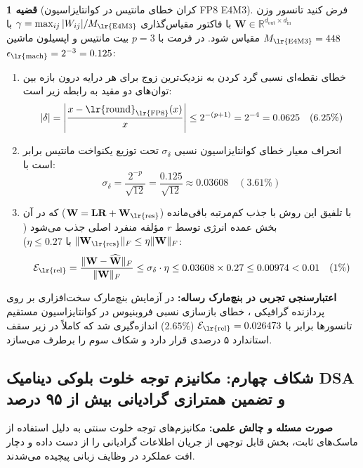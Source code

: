 \documentclass[12pt,a4paper]{report}
\theoremstyle{definition}
\newtheorem{theorem}{قضیه}[chapter]
\begin{document}
\begin{theorem}[کران خطای مانتیس در کوانتایزاسیون FP8 E4M3]
\label{thm:fp8_mantissa_bound}
فرض کنید تانسور وزن $\mathbf{W} \in \mathbb{R}^{d_{\text{out}} \times d_{\text{in}}}$ با فاکتور مقیاس‌گذاری $\gamma = \max_{ij} |W_{ij}| / M_{\text{\lr{E4M3}}}$ با $M_{\text{\lr{E4M3}}} = 448$ مقیاس شود. در فرمت  با $p = 3$ بیت مانتیس و اپسیلون ماشین $\epsilon_{\text{\lr{mach}}} = 2^{-3} = 0.125$:
\begin{enumerate}
    \item خطای نقطه‌ای نسبی گرد کردن به نزدیک‌ترین زوج  برای هر درایه درون بازه بین توان‌های دو مقید به رابطه زیر است:
    \begin{equation}
    |\delta| = \left| \frac{x - \text{\lr{round}}_{\text{\lr{FP8}}}(x)}{x} \right| \le 2^{-(p+1)} = 2^{-4} = 0.0625 \quad (6.25\%)
    \end{equation}
    \item انحراف معیار خطای کوانتایزاسیون نسبی $\sigma_\delta$ تحت توزیع یکنواخت مانتیس برابر است با:
    \begin{equation}
    \sigma_\delta = \frac{2^{-p}}{\sqrt{12}} = \frac{0.125}{\sqrt{12}} \approx 0.03608 \quad (3.61\%)
    \end{equation}
    \item با تلفیق این روش با جذب کم‌مرتبه باقی‌مانده ($\mathbf{W} = \mathbf{L}\mathbf{R} + \mathbf{W}_{\text{\lr{res}}}$) که در آن بخش عمده انرژی توسط $r$ مؤلفه منفرد اصلی جذب می‌شود ($\|\mathbf{W}_{\text{\lr{res}}}\|_F \le \eta \|\mathbf{W}\|_F$ با $\eta \le 0.27$):
    \begin{equation}
    \mathcal{E}_{\text{\lr{rel}}} = \frac{\|\mathbf{W} - \widehat{\mathbf{W}}\|_F}{\|\mathbf{W}\|_F} \le \sigma_\delta \cdot \eta \le 0.03608 \times 0.27 \le 0.00974 < 0.01 \quad (1\%)
    \end{equation}
\end{enumerate}
\end{theorem}

\textbf{اعتبارسنجی تجربی در بنچ‌مارک رساله:} در آزمایش بنچ‌مارک سخت‌افزاری بر روی پردازنده گرافیکی ، خطای بازسازی نسبی فروبنیوس در کوانتایزاسیون مستقیم تانسورها برابر با $\mathcal{E}_{\text{\lr{rel}}} = 0.026473$ ($2.65\%$) اندازه‌گیری شد که کاملاً در زیر سقف استاندارد ۵ درصدی قرار دارد و شکاف سوم را برطرف می‌سازد.

\subsection{شکاف چهارم: مکانیزم توجه خلوت بلوکی دینامیک DSA و تضمین همترازی گرادیانی بیش از ۹۵ درصد}
\label{subsec:gap4_dsa_gradient_alignment}
\textbf{صورت مسئله و چالش علمی:} مکانیزم‌های توجه خلوت سنتی به دلیل استفاده از ماسک‌های ثابت، بخش قابل توجهی از جریان اطلاعات گرادیانی را از دست داده و دچار افت عملکرد در وظایف زبانی پیچیده می‌شدند.
\end{document}
